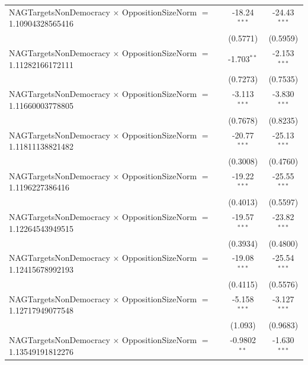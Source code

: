 \begin{tabular}{lcc}
   NAGTargetsNonDemocracy $\times$ OppositionSizeNorm $=$ 1.10904328565416      & -18.24$^{***}$       & -24.43$^{***}$\\   
                                                                                & (0.5771)             & (0.5959)\\   
   NAGTargetsNonDemocracy $\times$ OppositionSizeNorm $=$ 1.11282166172111      & -1.703$^{**}$        & -2.153$^{***}$\\   
                                                                                & (0.7273)             & (0.7535)\\   
   NAGTargetsNonDemocracy $\times$ OppositionSizeNorm $=$ 1.11660003778805      & -3.113$^{***}$       & -3.830$^{***}$\\   
                                                                                & (0.7678)             & (0.8235)\\   
   NAGTargetsNonDemocracy $\times$ OppositionSizeNorm $=$ 1.11811138821482      & -20.77$^{***}$       & -25.13$^{***}$\\   
                                                                                & (0.3008)             & (0.4760)\\   
   NAGTargetsNonDemocracy $\times$ OppositionSizeNorm $=$ 1.1196227386416       & -19.22$^{***}$       & -25.55$^{***}$\\   
                                                                                & (0.4013)             & (0.5597)\\   
   NAGTargetsNonDemocracy $\times$ OppositionSizeNorm $=$ 1.12264543949515      & -19.57$^{***}$       & -23.82$^{***}$\\   
                                                                                & (0.3934)             & (0.4800)\\   
   NAGTargetsNonDemocracy $\times$ OppositionSizeNorm $=$ 1.12415678992193      & -19.08$^{***}$       & -25.54$^{***}$\\   
                                                                                & (0.4115)             & (0.5576)\\   
   NAGTargetsNonDemocracy $\times$ OppositionSizeNorm $=$ 1.12717949077548      & -5.158$^{***}$       & -3.127$^{***}$\\   
                                                                                & (1.093)              & (0.9683)\\   
   NAGTargetsNonDemocracy $\times$ OppositionSizeNorm $=$ 1.13549191812276      & -0.9802$^{**}$       & -1.630$^{***}$\\   

\end{tabular}

